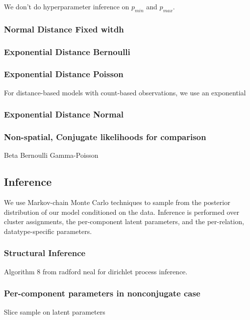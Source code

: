 \documentclass{article}
\begin{document}
We don't do hyperparameter inference on $p_{min}$ and $p_{max}$. 

\subsubsection{Normal Distance Fixed witdh}

\subsubsection{Exponential Distance Bernoulli}


\subsubsection{Exponential Distance Poisson}
For distance-based models with count-based observations, we use an exponential 


\subsubsection{Exponential Distance Normal}


\subsubsection{Non-spatial, Conjugate likelihoods for comparison}
Beta Bernoulli
Gamma-Poisson

\subsection{Inference}

We use Markov-chain Monte Carlo techniques to sample from the posterior 
distribution of our model conditioned on the data. Inference is
performed over cluster assignments, the per-component latent parameters, 
and the per-relation, datatype-specific parameters. 


\subsubsection{Structural Inference}
Algorithm 8 from radford neal \autocite{Neal2000} for dirichlet process
inference. 


\subsubsection{Per-component parameters in nonconjugate case}
Slice sample on latent parameters \autocite{Neal2003}
\end{document}
